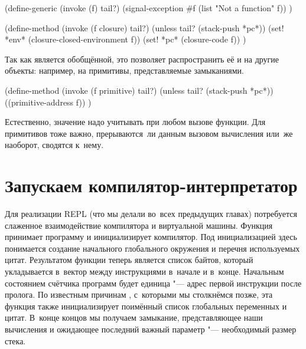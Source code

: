 \begin{code:lisp}
(define-generic (invoke (f) tail?)
  (signal-exception #f (list "Not a function" f)) )

(define-method (invoke (f closure) tail?)
  (unless tail? (stack-push *pc*))
  (set! *env* (closure-closed-environment f))
  (set! *pc* (closure-code f)) )
\end{code:lisp}

Так как  является обобщённой, это позволяет распространить её и на
другие объекты: например, на примитивы, представляемые замыканиями.

\begin{code:lisp}
(define-method (invoke (f primitive) tail?)
  (unless tail? (stack-push *pc*))
  ((primitive-address f)) )
\end{code:lisp}

Естественно, значение  надо учитывать при любом вызове функции. Для
примитивов тоже важно, прерываются~ли данным вызовом вычисления или~же наоборот,
сводятся к~нему.


\section{Запускаем компилятор-интерпретатор}%
\label{compilation/instruction/ssect:starting}

Для реализации REPL (что мы делали во~всех предыдущих главах) потребуется
слаженное взаимодействие компилятора и виртуальной машины. Функция
 принимает программу и инициализирует компилятор.
Под инициализацией здесь понимается создание начального глобального окружения
и перечня используемых цитат. Результатом функции  теперь является
список байтов, который укладывается в~вектор между инструкциями 
в~начале и  в~конце. Начальным состоянием счётчика программ будет
единица "--- адрес первой инструкции после пролога. По известным причинам
, с~которыми мы столкнёмся позже, эта функция также
инициализирует поимённый список глобальных переменных и цитат. В~конце концов
мы получаем замыкание, представляющее наши вычисления и ожидающее последний
важный параметр "--- необходимый размер стека.


